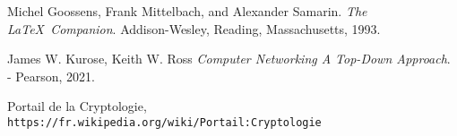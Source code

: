 \begin{thebibliography}{9}
    Michel Goossens, Frank Mittelbach, and Alexander Samarin. 
    \textit{The \LaTeX\ Companion}. 
    Addison-Wesley, Reading, Massachusetts, 1993.
    
    James W. Kurose, Keith W. Ross
    \textit{Computer Networking A Top-Down Approach}.
    - Pearson, 2021.
    
    Portail de la Cryptologie,
    \\\texttt{https://fr.wikipedia.org/wiki/Portail:Cryptologie}
    \end{thebibliography}
    
    